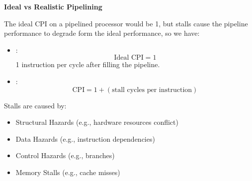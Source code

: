 \highspace
\begin{flushleft}
    \textcolor{Green3}{ \textbf{Ideal vs Realistic Pipelining}}
\end{flushleft}
The ideal CPI on a pipelined processor would be 1, but stalls cause the pipeline performance to degrade form the ideal performance, so we have:
\begin{itemize}
    \item {}:
    \begin{equation}
        \text{Ideal CPI} = 1
    \end{equation}
    1 instruction per cycle after filling the pipeline.
    \item {}:
    \begin{equation}
        \text{CPI} = 1 + (\text{stall cycles per instruction})
    \end{equation}
\end{itemize}
Stalls are caused by:
\begin{itemize}
    \item Structural Hazards (e.g., hardware resources conflict)
    \item Data Hazards (e.g., instruction dependencies)
    \item Control Hazards (e.g., branches)
    \item Memory Stalls (e.g., cache misses)
\end{itemize}

\newpage

